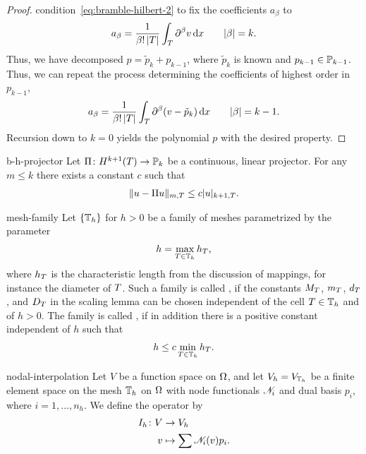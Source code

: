 \begin{proof}
  condition~\eqref{eq:bramble-hilbert-2} to fix the coefficients
  $a_\beta$ to
  \begin{gather*}
    a_\beta = \frac1{\beta!\,\abs{\cell}} \int_\cell \d^\beta v\dx
    \qquad \abs{\beta} = k.
  \end{gather*}
  Thus, we have decomposed $p = \tilde p_k + p_{k-1}$, where
  $\tilde p_k$ is known and $p_{k-1}\in \P_{k-1}$. Thus, we can repeat
  the process determining the coefficients of highest order in
  $p_{k-1}$,
  \begin{gather*}
    a_\beta = \frac1{\beta!\,\abs{\cell}} \int_\cell \d^\beta (v-\tilde p_k)\dx
    \qquad \abs{\beta} = k-1.
  \end{gather*}
  Recursion down to $k=0$ yields the polynomial $p$ with the desired property.
\end{proof}

\begin{Corollary}{b-h-projector}
  Let $\Pi\colon H^{k+1}(\cell) \to \P_k$ be a continuous, linear
  projector. For any $m\le k$ there exists a constant $c$ such that
  \begin{gather}
    \norm{u-\Pi u}_{m,\cell} \le c \snorm{u}_{k+1,\cell}.
  \end{gather}
\end{Corollary}

\begin{Definition}{mesh-family}
  Let $\{\mesh_h\}$ for $h>0$ be a family of meshes parametrized by
  the parameter
  \begin{gather}
    h = \max_{\cell\in\mesh_h} h_\cell,
  \end{gather}
  where $h_\cell$ is the characteristic length from the discussion of
  mappings, for instance the diameter of $\cell$. Such a family is
  called , if the constants $M_\cell$,
  $m_\cell$, $d_\cell$, and $D_\cell$ in the scaling lemma
  can be chosen independent of the cell $\cell\in\mesh_h$ and of
  $h>0$. The family is called , if in addition
  there is a positive constant independent of $h$ such that
  \begin{gather}
    h \le c \min_{\cell\in\mesh_h} h_\cell.
  \end{gather}
\end{Definition}

\begin{Definition}{nodal-interpolation}
  Let $V$ be a function space on $\domain$, and let
  $V_h = V_{\mesh_h}$ be a finite element space on the mesh $\mesh_h$
  on $\domain$ with node functionals $\nodal_i$ and dual basis $p_i$,
  where $i=1,\dots,n_h$. We define the 
  operator by
  \begin{gather}
    \begin{split}
      I_h\colon V&\to V_h\\
      v &\mapsto \sum \nodal_i(v)p_i.
    \end{split}
  \end{gather}
\end{Definition}

